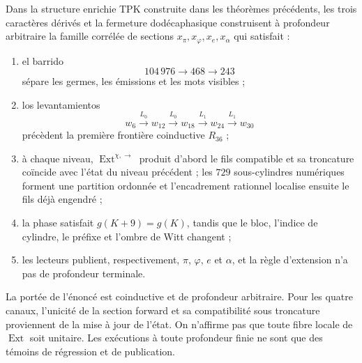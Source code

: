 \begin{theorem}
\label{thm:generacion-monodromica-conjunta-rev7}
Dans la structure enrichie TPK construite dans les théorèmes précédents, les
trois caractères dérivés et la fermeture dodécaphasique construisent à profondeur
arbitraire la famille corrélée de sections
\(x_\pi,x_\varphi,x_e,x_\alpha\) qui satisfait :
\begin{enumerate}
 \item el barrido
 \[
 104\,976\longrightarrow468\longrightarrow243
 \]
 sépare les germes, les émissions et les mots visibles ;
 \item los levantamientos
 \[
 w_6\xrightarrow{L_0}w_{12}\xrightarrow{L_0}w_{18}
 \xrightarrow{L_1}w_{24}\xrightarrow{L_1}w_{30}
 \]
 précèdent la première frontière coinductive \(R_{36}\) ;
 \item à chaque niveau,
 \(\operatorname{Ext}^{\chi,\rightarrow}\) produit d'abord le fils
 compatible et sa troncature coïncide avec l'état du niveau précédent ; les
 \(729\) sous-cylindres numériques forment une partition ordonnée et l'encadrement
 rationnel localise ensuite le fils déjà engendré ;
 \item la phase satisfait \(g(K+9)=g(K)\), tandis que le bloc, l'indice de
 cylindre, le préfixe et l'ombre de Witt changent ;
 \item les lecteurs publient, respectivement, \(\pi\), \(\varphi\), \(e\)
 et \(\alpha\), et la règle d'extension n'a pas de profondeur terminale.
\end{enumerate}
\end{theorem}

La portée de l'énoncé est coinductive et de profondeur arbitraire. Pour les
quatre canaux, l'unicité de la section forward et sa compatibilité sous
troncature proviennent de la mise à jour de l'état. On n'affirme pas que toute
fibre locale de \(\operatorname{Ext}\) soit unitaire. Les exécutions à toute
profondeur finie ne sont que des témoins de régression et de publication.

